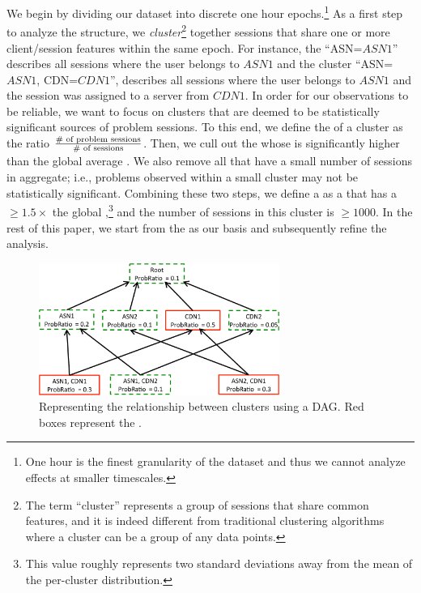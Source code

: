  We begin by dividing our dataset into discrete one 
 hour epochs.\footnote{One hour is the finest 
 granularity of the dataset and thus we cannot 
 analyze effects at smaller timescales.} As a
first step to analyze the structure, we 
\emph{cluster}\footnote{The term ``cluster'' represents a 
group of sessions that share common features, and it is 
indeed  different from traditional   clustering algorithms 
where a cluster can be a group of any data points.} 
together sessions that share one or more client/session 
features within the same epoch.   
For instance, the \cluster ``ASN=$\mathit{ASN1}$'' describes 
all sessions where the user belongs
to $\mathit{ASN1}$ and the cluster 
``ASN=$\mathit{ASN1}$, CDN=$\mathit{CDN1}$'', 
describes all sessions where the
user belongs to $\mathit{ASN1}$ and the session was 
assigned to a server from $\mathit{CDN1}$.
In order for our observations to be reliable, 
we want to focus on  clusters that are deemed to be 
statistically significant sources of problem sessions. 
To this end, we define the \problemratio of a
cluster as the ratio 
$\frac{\textrm{\# of problem sessions}}{\textrm{\# of
sessions}}$. Then, we cull out the \clusters whose 
\problemratio is
significantly higher than the global average \problemratio.  
We also remove all \clusters that have a small number 
of sessions in aggregate; i.e., problems observed within a 
small cluster may not be statistically significant.
Combining these two steps, we define a \problemcluster 
as a \cluster that has a \problemratio $\geq 1.5 \times$ the
global \problemratio,\footnote{This value roughly represents 
two standard deviations away  from the mean of the
per-cluster \problemratio distribution.}  and the number of 
sessions in this cluster is $\geq1000$.  
In the rest of this paper, we start from the \problemclusters 
as our basis and subsequently refine the analysis.

 
\begin{figure}[t!]
\centering
\includegraphics[width=0.7\textwidth]{figures/conext13-criticalcluster.pdf}
\caption{Representing the relationship between clusters using a DAG.  
Red boxes represent the \problemclusters.
}
\label{fig:method:critcluster}
\end{figure} 

